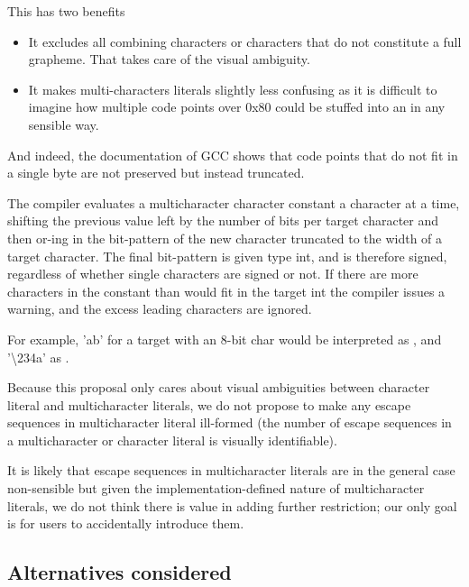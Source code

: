 \documentclass{wg21}
\begin{document}
    This has two benefits
    \begin{itemize}
        \item It excludes all combining characters or characters that do not constitute a full grapheme. That takes care of the visual ambiguity.
        \item It makes multi-characters literals slightly less confusing as it is difficult to imagine how multiple code points over 0x80 could be stuffed into an  in any sensible way.
    \end{itemize}
    And indeed, the documentation of GCC shows that code points that do not fit in a single byte are not preserved but instead truncated.
    \begin{quoteblock}
        The compiler evaluates a multicharacter character constant a character at a time, shifting the previous value left by the number of bits per target character and then or-ing in the bit-pattern of the new character truncated to the width of a target character. The final bit-pattern is given type int, and is therefore signed, regardless of whether single characters are signed or not. If there are more characters in the constant than would fit in the target int the compiler issues a warning, and the excess leading characters are ignored.
        
        For example, 'ab' for a target with an 8-bit char would be interpreted as , and '\textbackslash 234a' as .
    \end{quoteblock}
    
    Because this proposal only cares about visual ambiguities between character literal and multicharacter literals, we do not propose to
    make any escape sequences in multicharacter literal ill-formed (the number of escape sequences in a multicharacter or character literal is visually identifiable).
    
    It is likely that escape sequences in multicharacter literals are in the general case non-sensible but given the implementation-defined nature of
    multicharacter literals, we do not think there is value in adding further restriction; our only goal is for users to accidentally introduce them.
    
    \subsection{Alternatives considered}
    
\end{document}
